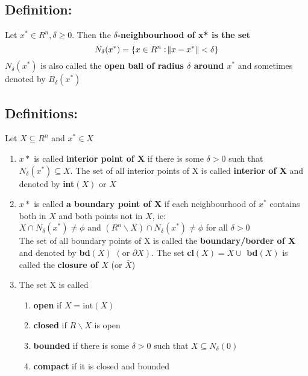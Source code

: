 \documentclass{article}
\begin{document}
\subsection*{Definition:}
Let $x^\ast\in R^{n}, \delta \geq 0$. Then the \textbf{$\delta$-neighbourhood of x* is the set} 
\begin{equation*} N_{\delta}(x^\ast) = \{x\in R^{n}: \norm{x-x^\ast} < \delta \}\end{equation*} 
$N_\delta(x^\ast)$ is also called the \textbf{open ball of radius $\delta$ around $x^\ast$} and sometimes denoted by $B_\delta(x^\ast)$
\newpage
\subsection*{Definitions:} 
Let $X\subseteq R^{n}$ and $x^\ast \in X$
\begin{enumerate}
    \item $x\ast$ is called \textbf{interior point of X} if there is some $\delta > 0$  such that $N_\delta(x^\ast) \subseteq X$. The set of all interior points of X is called \textbf{interior of X} and denoted by \textbf{int$(X)$} or $\dot{X}$ 
    \item $x\ast$ is called \textbf{a boundary point of X} if each neighbourhood of $x^\ast$ contains both in $X$ and both points not in $X$, ie: \\
    $X \cap N_\delta(x^\ast) \neq \phi$ and $(R^n\backslash X) \cap N_\delta(x^\ast)\neq \phi$ for all $\delta > 0$ 
    \\ The set of all boundary points of X is called the \textbf{boundary/border of X} and denoted by \textbf{bd$(X)$} $(\text{or  }  \partial X)$. The set \textbf{cl$(X) = X \cup$ bd$(X)$} is called the \textbf{closure of $X$} (or $\bar{X}$)  
    \item The set X is called 
    \begin{enumerate}
        \item \textbf{open} if $X = \text{int}(X)$ 
        \item \textbf{closed} if $R\backslash X$ is open
        \item \textbf{bounded} if there is some $\delta > 0$ such that $X\subseteq N_\delta(0)$
        \item \textbf{compact} if it is closed and bounded
    \end{enumerate}

\end{enumerate}
\end{document}
